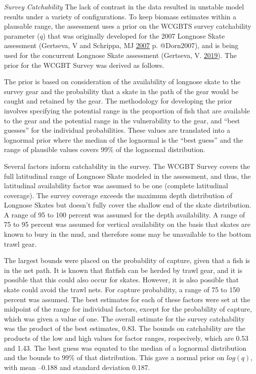 \documentclass[12pt,]{article}
\begin{document}
\vspace{.5cm}

\emph{Survey Catchability} The lack of contrast in the data resulted in
unstable model results under a variety of configurations. To keep
biomass estimates within a plausable range, the assessment uses a prior
on the WCGBTS survey catchability parameter (\(q\)) that was originally
developed for the 2007 Longnose Skate assessment (Gertseva, V and
Schrippa, MJ \protect\hyperlink{ref-Gertseva2007}{2007} p. @Dorn2007),
and is being used for the concurrent Longnose Skate assessment
(Gertseva, V. \protect\hyperlink{ref-Gertseva2019}{2019}). The prior for
the WCGBT Survey was derived as follows.

The prior is based on consideration of the availability of longnose
skate to the survey gear and the probability that a skate in the path of
the gear would be caught and retained by the gear. The methodology for
developing the prior involves specifying the potential range in the
proportion of fish that are available to the gear and the potential
range in the vulnerability to the gear, and ``best guesses'' for the
individual probabilities. These values are translated into a lognormal
prior where the median of the lognormal is the ``best guess'' and the
range of plausible values covers 99\% of the lognormal distribution.

Several factors inform catchability in the survey. The WCGBT Survey
covers the full latitudinal range of Longnose Skate modeled in the
assessment, and thus, the latitudinal availability factor was assumed to
be one (complete latitudinal coverage). The survey coverage exceeds the
maximum depth distribution of Longnose Skates but doesn't fully cover
the shallow end of the skate distribution. A range of 95 to 100 percent
was assumed for the depth availability. A range of 75 to 95 percent was
assumed for vertical availability on the basis that skates are known to
bury in the mud, and therefore some may be unavailable to the bottom
trawl gear.

The largest bounds were placed on the probability of capture, given that
a fish is in the net path. It is known that flatfish can be herded by
trawl gear, and it is possible that this could also occur for skates.
However, it is also possible that skate could avoid the trawl nets. For
capture probability, a range of 75 to 150 percent was assumed. The best
estimates for each of these factors were set at the midpoint of the
range for individual factors, except for the probability of capture,
which was given a value of one. The overall estimate for the survey
catchability was the product of the best estimates, 0.83. The bounds on
catchability are the products of the low and high values for factor
ranges, respecively, which are 0.53 and 1.43. The best guess was equated
to the median of a lognormal distribution and the bounds to 99\% of that
distribution. This gave a normal prior on \(log(q)\), with mean --0.188
and standard deviation 0.187.
\end{document}
